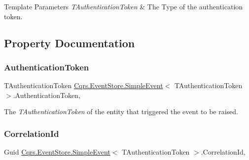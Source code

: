 \begin{DoxyTemplParams}{Template Parameters}
{\em T\+Authentication\+Token} & The Type of the authentication token.\\
\hline
\end{DoxyTemplParams}


\subsection{Property Documentation}
\mbox{\label{classCqrs_1_1EventStore_1_1SimpleEvent_a91ca9d263c41a4b5ffc30f9245aa6fe9_a91ca9d263c41a4b5ffc30f9245aa6fe9}} 
\subsubsection{\texorpdfstring{Authentication\+Token}{AuthenticationToken}}
{\footnotesize\ttfamily T\+Authentication\+Token \hyperlink{classCqrs_1_1EventStore_1_1SimpleEvent}{Cqrs.\+Event\+Store.\+Simple\+Event}$<$ T\+Authentication\+Token $>$.Authentication\+Token\hspace{0.3cm}{\ttfamily [get]}, {\ttfamily [set]}}



The {\itshape T\+Authentication\+Token}  of the entity that triggered the event to be raised. 

\mbox{\label{classCqrs_1_1EventStore_1_1SimpleEvent_aa96b900b0fef8e6b2f6af81b5ce99f16_aa96b900b0fef8e6b2f6af81b5ce99f16}} 
\subsubsection{\texorpdfstring{Correlation\+Id}{CorrelationId}}
{\footnotesize\ttfamily Guid \hyperlink{classCqrs_1_1EventStore_1_1SimpleEvent}{Cqrs.\+Event\+Store.\+Simple\+Event}$<$ T\+Authentication\+Token $>$.Correlation\+Id\hspace{0.3cm}{\ttfamily [get]}, {\ttfamily [set]}}



